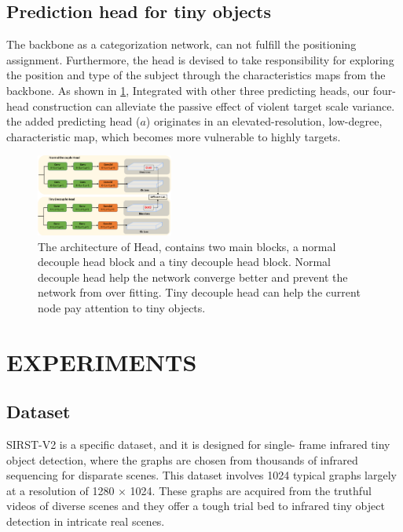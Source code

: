 \documentclass[journal]{IEEEtran}
\begin{document}
\subsection{Prediction head for tiny objects}
The backbone as a categorization network, can not fulfill the positioning assignment. Furthermore, the head is devised to take responsibility for exploring the position and type of the subject through the characteristics maps from  the  backbone\cite{zhu2021tph}. As shown in \ref{fig: Head}, Integrated with other three predicting heads, our four-head construction can alleviate the passive effect of violent target scale variance. the added predicting head ($a$) originates in an elevated-resolution, low-degree, characteristic map,  which becomes more vulnerable to highly targets. 

\begin{figure}[htbp]
    \centering
    \includegraphics[width=0.4\textwidth]{Head}
    
    \caption {The architecture of Head, contains two main blocks, a normal decouple head block and a tiny decouple head block. Normal decouple head help the network converge better and prevent the network from over fitting. Tiny decouple head can help the current node pay attention to tiny objects.}
    \label{fig: Head}
\end{figure}

\section{EXPERIMENTS}
\subsection{Dataset}
SIRST-V2 is a specific dataset, and it is designed for single- frame infrared tiny object detection, where the graphs are chosen from thousands of infrared sequencing for disparate scenes. This dataset involves 1024 typical graphs largely at a resolution of 1280 × 1024. These graphs are acquired from the truthful videos of diverse scenes and they offer a tough trial bed to infrared tiny object detection in intricate real scenes.
\end{document}

